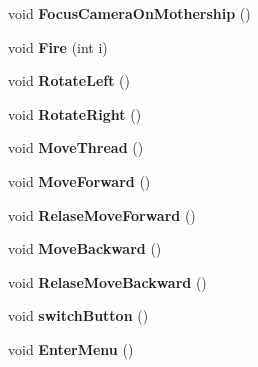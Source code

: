 \begin{DoxyCompactItemize}
\item 
\hypertarget{class_g_u_i_a6b1c4e932598b7de6259dcc581245d72}{}void {\bfseries Focus\+Camera\+On\+Mothership} ()\label{class_g_u_i_a6b1c4e932598b7de6259dcc581245d72}

\item 
\hypertarget{class_g_u_i_a33d7090635ea7d781aeb30c36b56baeb}{}void {\bfseries Fire} (int i)\label{class_g_u_i_a33d7090635ea7d781aeb30c36b56baeb}

\item 
\hypertarget{class_g_u_i_ac6f3c858b03325d104f8e92abad3beca}{}void {\bfseries Rotate\+Left} ()\label{class_g_u_i_ac6f3c858b03325d104f8e92abad3beca}

\item 
\hypertarget{class_g_u_i_a5be6cec67cb12fe9c34831c6a37a448f}{}void {\bfseries Rotate\+Right} ()\label{class_g_u_i_a5be6cec67cb12fe9c34831c6a37a448f}

\item 
\hypertarget{class_g_u_i_aa1c020d86b1899f0ce8e10a5eefeb548}{}void {\bfseries Move\+Thread} ()\label{class_g_u_i_aa1c020d86b1899f0ce8e10a5eefeb548}

\item 
\hypertarget{class_g_u_i_a8f7309ef0bce4e859fea46886bcc4324}{}void {\bfseries Move\+Forward} ()\label{class_g_u_i_a8f7309ef0bce4e859fea46886bcc4324}

\item 
\hypertarget{class_g_u_i_a656a36d3e58467720d6090842df32e92}{}void {\bfseries Relase\+Move\+Forward} ()\label{class_g_u_i_a656a36d3e58467720d6090842df32e92}

\item 
\hypertarget{class_g_u_i_a86f74a1dc3f4e8451d4ec08973fe18a8}{}void {\bfseries Move\+Backward} ()\label{class_g_u_i_a86f74a1dc3f4e8451d4ec08973fe18a8}

\item 
\hypertarget{class_g_u_i_ac087dffea46c45cbe70926736f1f8bf4}{}void {\bfseries Relase\+Move\+Backward} ()\label{class_g_u_i_ac087dffea46c45cbe70926736f1f8bf4}

\item 
\hypertarget{class_g_u_i_a626686f714c8975f845b6e6d011ae6c4}{}void {\bfseries switch\+Button} ()\label{class_g_u_i_a626686f714c8975f845b6e6d011ae6c4}

\item 
\hypertarget{class_g_u_i_aa4c1b5af4f5587eefcba5d02b950a4f3}{}void {\bfseries Enter\+Menu} ()\label{class_g_u_i_aa4c1b5af4f5587eefcba5d02b950a4f3}


\end{DoxyCompactItemize}
